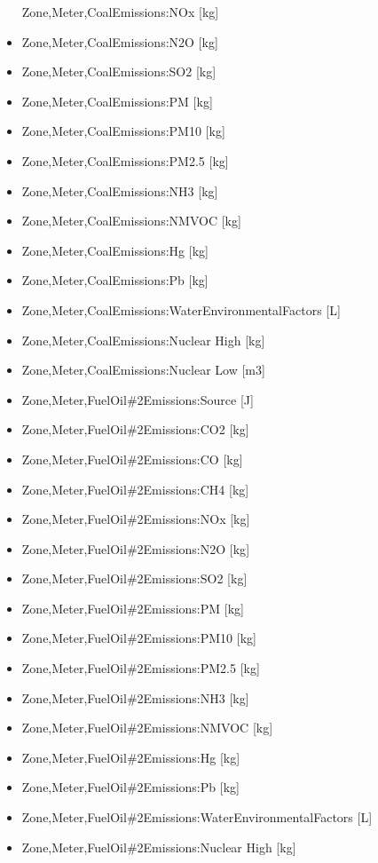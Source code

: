 \begin{itemize}
  Zone,Meter,CoalEmissions:NOx {[}kg{]}
\item
  Zone,Meter,CoalEmissions:N2O {[}kg{]}
\item
  Zone,Meter,CoalEmissions:SO2 {[}kg{]}
\item
  Zone,Meter,CoalEmissions:PM {[}kg{]}
\item
  Zone,Meter,CoalEmissions:PM10 {[}kg{]}
\item
  Zone,Meter,CoalEmissions:PM2.5 {[}kg{]}
\item
  Zone,Meter,CoalEmissions:NH3 {[}kg{]}
\item
  Zone,Meter,CoalEmissions:NMVOC {[}kg{]}
\item
  Zone,Meter,CoalEmissions:Hg {[}kg{]}
\item
  Zone,Meter,CoalEmissions:Pb {[}kg{]}
\item
  Zone,Meter,CoalEmissions:WaterEnvironmentalFactors {[}L{]}
\item
  Zone,Meter,CoalEmissions:Nuclear High {[}kg{]}
\item
  Zone,Meter,CoalEmissions:Nuclear Low {[}m3{]}
\item
  Zone,Meter,FuelOil\#2Emissions:Source {[}J{]}
\item
  Zone,Meter,FuelOil\#2Emissions:CO2 {[}kg{]}
\item
  Zone,Meter,FuelOil\#2Emissions:CO {[}kg{]}
\item
  Zone,Meter,FuelOil\#2Emissions:CH4 {[}kg{]}
\item
  Zone,Meter,FuelOil\#2Emissions:NOx {[}kg{]}
\item
  Zone,Meter,FuelOil\#2Emissions:N2O {[}kg{]}
\item
  Zone,Meter,FuelOil\#2Emissions:SO2 {[}kg{]}
\item
  Zone,Meter,FuelOil\#2Emissions:PM {[}kg{]}
\item
  Zone,Meter,FuelOil\#2Emissions:PM10 {[}kg{]}
\item
  Zone,Meter,FuelOil\#2Emissions:PM2.5 {[}kg{]}
\item
  Zone,Meter,FuelOil\#2Emissions:NH3 {[}kg{]}
\item
  Zone,Meter,FuelOil\#2Emissions:NMVOC {[}kg{]}
\item
  Zone,Meter,FuelOil\#2Emissions:Hg {[}kg{]}
\item
  Zone,Meter,FuelOil\#2Emissions:Pb {[}kg{]}
\item
  Zone,Meter,FuelOil\#2Emissions:WaterEnvironmentalFactors {[}L{]}
\item
  Zone,Meter,FuelOil\#2Emissions:Nuclear High {[}kg{]}

\end{itemize}

